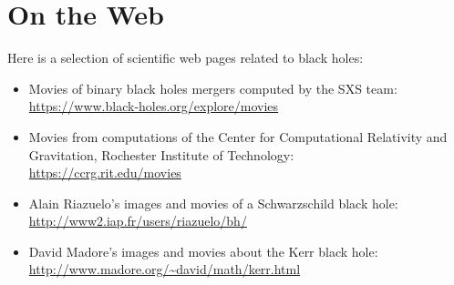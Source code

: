 \chapter{On the Web} \label{s:web}

\minitoc

Here is a selection of scientific web pages related to black holes:

\begin{itemize}
\item Movies of binary black holes mergers computed by the SXS team:\\
\url{https://www.black-holes.org/explore/movies}
\item Movies from computations of the Center for Computational Relativity
and Gravitation, Rochester Institute of Technology:\\
\url{https://ccrg.rit.edu/movies}
\item Alain Riazuelo's images and movies of a Schwarzschild black hole:\\
\url{http://www2.iap.fr/users/riazuelo/bh/}
\item David Madore's images and movies about the Kerr black hole:\\
\url{http://www.madore.org/~david/math/kerr.html}
\end{itemize}

